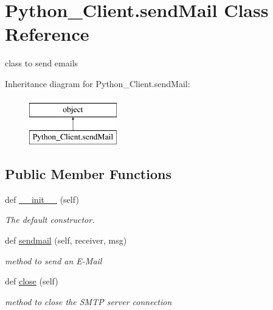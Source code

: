 \hypertarget{class_python___client_1_1send_mail}{}\section{Python\+\_\+\+Client.\+send\+Mail Class Reference}
\label{class_python___client_1_1send_mail}


class to send emails  


Inheritance diagram for Python\+\_\+\+Client.\+send\+Mail\+:\begin{figure}[H]
\begin{center}
\leavevmode
\includegraphics[height=2.000000cm]{class_python___client_1_1send_mail}
\end{center}
\end{figure}
\subsection*{Public Member Functions}
\begin{DoxyCompactItemize}
\item 
def \mbox{\hyperlink{class_python___client_1_1send_mail_abbe76ea5ec26636335cc40c07e1746c6}{\+\_\+\+\_\+init\+\_\+\+\_\+}} (self)
\begin{DoxyCompactList}\small\item\em The default constructor. \end{DoxyCompactList}\item 
def \mbox{\hyperlink{class_python___client_1_1send_mail_a5d245cd00e2df903015928d0902632d8}{sendmail}} (self, receiver, msg)
\begin{DoxyCompactList}\small\item\em method to send an E-\/\+Mail \end{DoxyCompactList}\item 
\mbox{\label{class_python___client_1_1send_mail_a333f9ed9a6c5499d92955ebd8ddb0399}} 
def \mbox{\hyperlink{class_python___client_1_1send_mail_a333f9ed9a6c5499d92955ebd8ddb0399}{close}} (self)
\begin{DoxyCompactList}\small\item\em method to close the S\+M\+TP server connection \end{DoxyCompactList}\end{DoxyCompactItemize}
